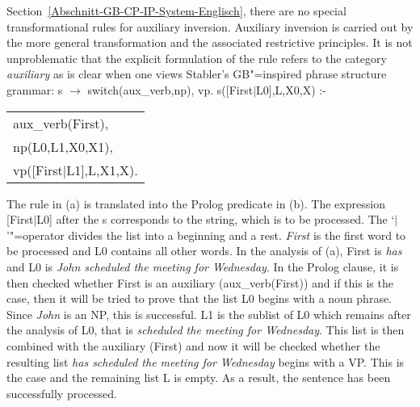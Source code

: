 Section~\ref{Abschnitt-GB-CP-IP-System-Englisch}, there are no special transformational rules for auxiliary inversion. Auxiliary inversion is carried out by the more general transformation \movealpha and
the associated restrictive principles. It is not unproblematic that the explicit formulation of the rule refers to the category \emph{auxiliary}
as is clear when one views Stabler's GB"=inspired phrase structure grammar: 
\eal
\ex\label{Regel-Aux-inv-Stabler} s $\to$ switch(aux\_verb,np), vp.
\ex s([First$|$L0],L,X0,X) :- \begin{tabular}[t]{@{}l@{}}
                              aux\_verb(First),\\
                              np(L0,L1,X0,X1),\\
                              vp([First$|$L1],L,X1,X).\\
                              \end{tabular}
\zl
%
The rule in (a) is translated into the Prolog predicate in (b). The expression [First$|$L0] after the s corresponds to the string, which
is to be processed. The `$|$'"=operator divides the list into a beginning and a rest. \emph{First} is the first word to be processed
and L0 contains all other words. In the analysis of (a), First is \emph{has} and L0 is \emph{John scheduled the meeting for Wednesday}.
In the Prolog clause, it is then checked whether First is an auxiliary (aux\_verb(First)) and if
this is the case, then it will be tried to prove that the list L0 begins with a noun phrase. Since \emph{John} is an NP, this is successful. L1 is the sublist of L0 which remains after the analysis of L0, that is
\emph{scheduled the meeting for Wednesday}. This list is then combined with the auxiliary (First) and now it will be checked whether the resulting
list \emph{has scheduled the meeting for Wednesday} begins with a VP. This is the case and the remaining list L is empty. As a result, the
sentence has been successfully processed.


